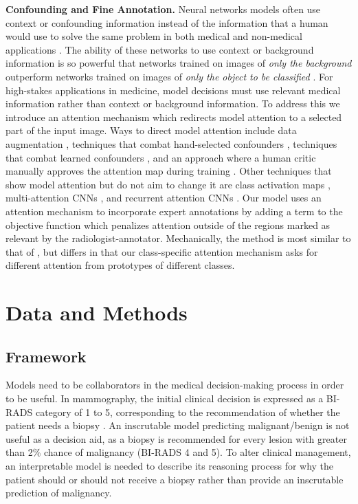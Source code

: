 \documentclass[11pt]{article}
\begin{document}
\noindent\textbf{Confounding and Fine Annotation.} \label{sec:confounding_RW}
Neural networks models often use context or confounding information instead of the information that a human would use to solve the same problem in both medical \citep{wang2019removing} and non-medical applications \citep{hu2020stratified}. The ability of these networks to use context or background information is so powerful that networks trained on images of \textit{only the background} outperform networks trained on images of \textit{only the object to be classified} \citep{dundar2017context,xiao2020noise}. 
For high-stakes applications in medicine, model decisions must use relevant medical information rather than context or background information. 
To address this we introduce an attention mechanism which redirects model attention to a selected part of the input image. Ways to direct model attention include data augmentation \citep{dundar2017context, LUO2016361, BMVC2016_110}, techniques that combat hand-selected confounders \citep{wang2019removing, tang2020mitigating}, techniques that combat learned confounders \citep{zhao2020training}, and an approach where a human critic manually approves the attention map during training \citep{Schramowski20}. Other techniques that show model attention but do not aim to change it are class activation maps \citep{zhou2016learning}, multi-attention CNNs \citep{zheng2017learning}, and recurrent attention CNNs \citep{fu2017look}. 
Our model uses an attention mechanism to incorporate expert annotations by adding a term to the objective function which penalizes attention outside of the regions marked as relevant by the radiologist-annotator. Mechanically, the method is most similar to that of \cite{tang2020mitigating}, but differs in that our class-specific attention mechanism asks for different attention from prototypes of different classes.

\section{Data and Methods}

\subsection{Framework}

Models need to be collaborators in the medical decision-making process in order to be useful. 
In mammography, the initial clinical decision is expressed as a BI-RADS category of 1 to 5, corresponding to the recommendation of whether the patient needs a biopsy \citep{orel1999bi,sickles2013acr}. An inscrutable model predicting malignant/benign is not useful as a decision aid, as a biopsy is recommended for every lesion with greater than 2\% chance of malignancy (BI-RADS 4 and 5). To alter clinical management, an interpretable model is needed to describe its reasoning process for why the patient should or should not receive a biopsy rather than provide an inscrutable prediction of malignancy.
\end{document}
